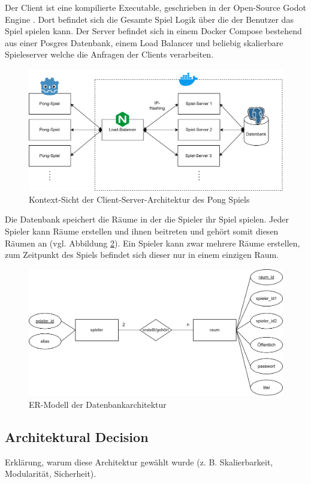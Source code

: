 \documentclass[
]{article}
\begin{document}
Der Client ist eine kompilierte Executable, geschrieben in der Open-Source Godot Engine \cite{godot}. Dort befindet sich die Gesamte Spiel Logik über die der Benutzer das Spiel spielen kann. Der Server befindet sich in einem Docker Compose bestehend aus einer Posgres Datenbank, einem Load Balancer und beliebig skalierbare Spieleserver welche die Anfragen der Clients verarbeiten. 
\begin{figure}[H]
	\centering
	\includegraphics[width=\textwidth ]{resources/Client-Server.drawio.png}
	\caption{Kontext-Sicht der Client-Server-Architektur des Pong Spiels}
	\label{fig:clientserver}
\end{figure}
Die Datenbank speichert die Räume in der die Spieler ihr Spiel spielen. Jeder Spieler kann Räume erstellen und ihnen beitreten und gehört somit diesen Räumen an (vgl. Abbildung \ref{fig:ER-Modell}). Ein Spieler kann zwar mehrere Räume erstellen, zum Zeitpunkt des Spiels befindet sich dieser nur in einem einzigen Raum.
\begin{figure}[H]
	\centering
	\includegraphics[width=\textwidth ]{resources/ER-Modell.png}
	\caption{ER-Modell der Datenbankarchitektur}
	\label{fig:ER-Modell}
\end{figure}

\subsection{Architektural Decision}
Erklärung, warum diese Architektur gewählt wurde (z. B. Skalierbarkeit, Modularität, Sicherheit).
\end{document}
